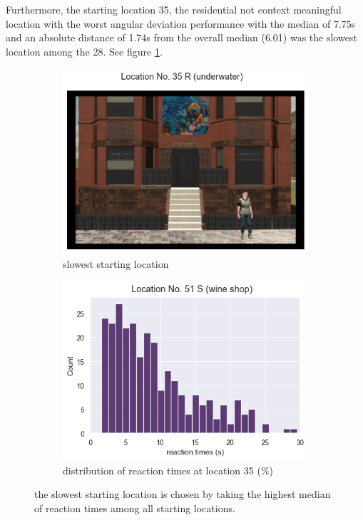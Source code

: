 Furthermore, the starting location 35, the residential not context meaningful location with the worst angular deviation performance with the median of 7.75s and an absolute distance of 1.74s from the overall median (6.01) was the slowest location among the 28. See figure \ref{fig:slowest_loc}.

\begin{figure}[!htb]
	\begin{subfigure}[b]{0.48\linewidth}
		\includegraphics[width=\linewidth]{figures/worst_loc_angular_error__withHA_23.png}
		\caption{slowest starting location}
		\label{fig:slowest_loc}
	\end{subfigure}
	\begin{subfigure}[b]{0.48\linewidth}
		\includegraphics[width=\linewidth]{figures/slowest_loc_RT_dist_35_23.png}
		\caption{distribution of reaction times at location 35 (\%)}
		\label{fig:best_angular_dist_35}
	\end{subfigure}
	
	\caption[Slowest starting location]{the slowest starting location is chosen by taking the highest median of reaction times among all starting locations.}
\end{figure}
\label{fig:slowest_location}

